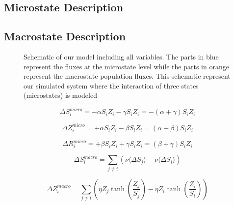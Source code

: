 \documentclass[11pt]{article} %
\begin{document}
\subsection{Microstate Description}\indent

\subsection{Macrostate Description}\indent






\begin{figure}[h!]
\caption{Schematic of our model including all variables. The parts in blue represent the fluxes at the microstate level while the parts in orange represent the macrostate population fluxes. This schematic represent our simulated system where the interaction of three states (microstates) is modeled \label{overallmodel} }
\end{figure}

\begin{equation}  \label{eq:smicro}
\Delta S_{i}^{micro} = -\alpha S_{i} Z_{i} -\gamma S_{i} Z_{i} = -(\alpha + \gamma) S_{i} Z_{i}
\end{equation}

\begin{equation} \label{eq:zmicro}
\Delta Z_{i}^{micro} = +\alpha S_{i} Z_{i} - \beta S_{i} Z_{i} = (\alpha - \beta) S_{i} Z_{i}
\end{equation}

\begin{equation} \label{eq:rmicro}
\Delta R_{i}^{micro} = +\beta S_{i} Z_{i} + \gamma S_{i} Z_{i} = (\beta + \gamma) S_{i} Z_{i}
\end{equation}

\begin{equation} \label{eq:smacro}
\Delta S_{i}^{macro} =  \sum_{j\neq i}{ \left( \nu \langle \Delta S_{j} \rangle - \nu  \langle \Delta S_{i} \rangle \right) }
\end{equation}

\begin{equation} \label{eq:zmacro}
\Delta Z_{i}^{macro} = \sum_{j\neq i}{\left( \eta Z_{j}\tanh \left( \frac{Z_{j}}{S_{j}}\right) -\eta Z_{i}\tanh \left( \frac{Z_{i}}{S_{i}}\right) \right)}
\end{equation}



\newpage
\end{document}
